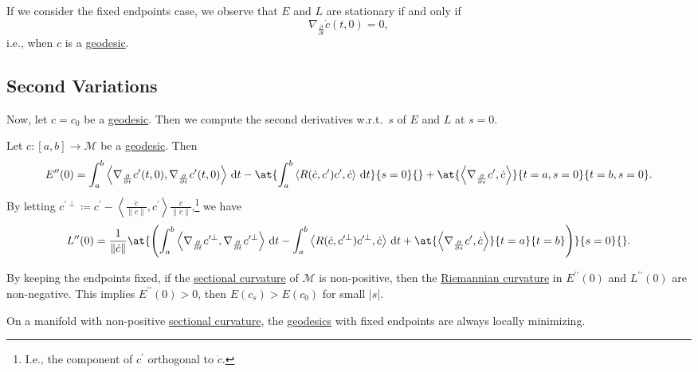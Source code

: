 If we consider the fixed endpoints case, we observe that \(E\) and \(L\) are stationary if and only if
\[
	\nabla _{\frac{\partial }{\partial t}} \dot{c} (t, 0) = 0,
\]
i.e., when \(c\) is a \hyperref[def:geodesic]{geodesic}.

\subsection{Second Variations}
Now, let \(c = c_0\) be a \hyperref[def:geodesic]{geodesic}. Then we compute the second derivatives w.r.t.\ \(s\) of \(E\) and \(L\) at \(s = 0\).

\begin{theorem}
	Let \(c\colon [a, b] \to \mathcal{M} \) be a \hyperref[def:geodesic]{geodesic}. Then
	\[
		E^{\prime\prime}(0)
		= \int_{a}^{b} \left\langle \nabla _{\frac{\partial }{\partial t} } c^{\prime} (t, 0), \nabla _{\frac{\partial }{\partial t} } c^{\prime} (t, 0)\right\rangle  \,\mathrm{d}t
		- \at{\int_{a}^{b} \left\langle R(\dot{c} , c^{\prime} ) c^{\prime} , \dot{c} \right\rangle \,\mathrm{d}t}{s= 0}{}
		+ \at{\left\langle \nabla _{\frac{\partial }{\partial s} } c^{\prime} , \dot{c}  \right\rangle }{t=a, s=0}{t=b, s=0} .
	\]
	By letting \(c^{\prime \perp } \coloneqq c^{\prime} - \left\langle \frac{\dot{c} }{\lVert \dot{c} \rVert } , c^{\prime} \right\rangle \frac{\dot{c} }{\lVert \dot{c} \rVert} \),\footnote{I.e., the component of \(c^{\prime} \) orthogonal to \(\dot{c} \).} we have
	\[
		L^{\prime\prime} (0)
		= \frac{1}{\lVert \dot{c} \rVert } \at{\left(
		\int_{a}^{b} \left\langle \nabla _{\frac{\partial }{\partial t} } c^{\prime\perp }, \nabla _{\frac{\partial }{\partial t} } c^{\prime\perp }\right\rangle \,\mathrm{d}t
		- \int_{a}^{b} \left\langle R(\dot{c}, c^{\prime\perp } )c^{\prime\perp }, \dot{c} \right\rangle \,\mathrm{d}t
		+ \at{\left\langle \nabla _{\frac{\partial }{\partial s} }c^{\prime} , \dot{c} \right\rangle }{t=a}{t=b} \right) }{s=0}{}.
	\]
\end{theorem}

\begin{remark}
	By keeping the endpoints fixed, if the \hyperref[def:sectional-curvature]{sectional curvature} of \(\mathcal{M} \)  is non-positive, then the \hyperref[def:Riemannian-curvature]{Riemannian curvature} in \(E^{\prime\prime} (0)\) and \(L^{\prime\prime} (0)\) are non-negative. This implies \(E^{\prime\prime} (0) > 0\), then \(E(c_s) > E(c_0)\) for small \(\vert s \vert \).
\end{remark}

\begin{corollary}
	On a manifold with non-positive \hyperref[def:sectional-curvature]{sectional curvature}, the \hyperref[def:geodesic]{geodesics} with fixed endpoints are always locally minimizing.
\end{corollary}

